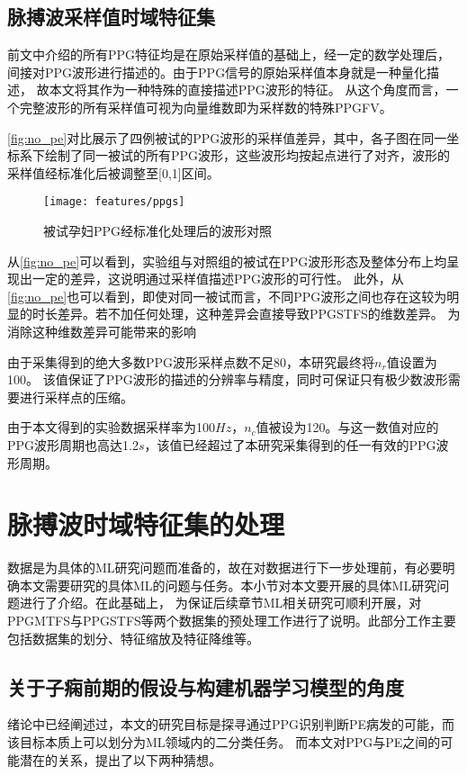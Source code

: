 \subsection{脉搏波采样值时域特征集}

前文中介绍的所有PPG特征均是在原始采样值的基础上，经一定的数学处理后，间接对PPG波形进行描述的。由于PPG信号的原始采样值本身就是一种量化描述，
故本文将其作为一种特殊的直接描述PPG波形的特征。
从这个角度而言，一个完整波形的所有采样值可视为向量维数即为采样数的特殊PPGFV。

\autoref{fig:no_pe}对比展示了四例被试的PPG波形的采样值差异，其中，各子图在同一坐标系下绘制了同一被试的所有PPG波形，这些波形均按起点进行了对齐，波形的采样值经标准化后被调整至[0,1]区间。

\begin{figure}[htbp]
  \centering
  \texttt{[image: features/ppgs]}
  \caption{\label{fig:no_pe}被试孕妇PPG经标准化处理后的波形对照}
\end{figure}

从\autoref{fig:no_pe}可以看到，实验组与对照组的被试在PPG波形形态及整体分布上均呈现出一定的差异，这说明通过采样值描述PPG波形的可行性。
此外，从\autoref{fig:no_pe}也可以看到，即使对同一被试而言，不同PPG波形之间也存在这较为明显的时长差异。若不加任何处理，这种差异会直接导致PPGSTFS的维数差异。
为消除这种维数差异可能带来的影响



由于采集得到的绝大多数PPG波形采样点数不足80，本研究最终将$n_r$值设置为100。
该值保证了PPG波形的描述的分辨率与精度，同时可保证只有极少数波形需要进行采样点的压缩。

由于本文得到的实验数据采样率为100$Hz$，$n_c$值被设为120。与这一数值对应的PPG波形周期也高达1.2$s$，该值已经超过了本研究采集得到的任一有效的PPG波形周期。


\section{脉搏波时域特征集的处理}
数据是为具体的ML研究问题而准备的，故在对数据进行下一步处理前，有必要明确本文需要研究的具体ML的问题与任务。本小节对本文要开展的具体ML研究问题进行了介绍。在此基础上，
为保证后续章节ML相关研究可顺利开展，对PPGMTFS与PPGSTFS等两个数据集的预处理工作进行了说明。此部分工作主要包括数据集的划分、特征缩放及特征降维等。

\subsection{关于子痫前期的假设与构建机器学习模型的角度}
绪论中已经阐述过，本文的研究目标是探寻通过PPG识别判断PE病发的可能，而该目标本质上可以划分为ML领域内的二分类任务。
而本文对PPG与PE之间的可能潜在的关系，提出了以下两种猜想。


